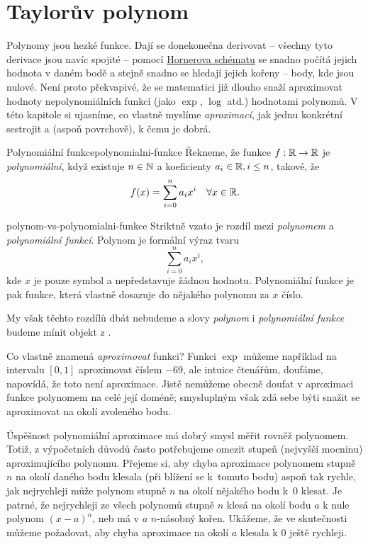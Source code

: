 \chapter{Taylorův polynom}
\label{chap:tayloruv-polynom}


Polynomy jsou hezké funkce. Dají se donekonečna derivovat -- všechny tyto
derivace jsou navíc spojité -- pomocí
\href{https://en.wikipedia.org/wiki/Horner%27s_method}{Hornerova schématu} se
 snadno počítá jejich hodnota v daném bodě a stejně snadno se hledají jejich
 kořeny -- body, kde jsou nulové. Není proto překvapivé, že se matematici již
 dlouho snaží aproximovat hodnoty nepolynomiálních funkcí (jako $\exp$, $\log$
 atd.) hodnotami polynomů. V této kapitole si ujasníme, co vlastně myslíme
 \emph{aproximací}, jak jednu konkrétní sestrojit a (aspoň povrchově), k čemu je
 dobrá.

\begin{definition}{Polynomiální funkce}{polynomialni-funkce}
 Řekneme, že funkce $f:\mathbb{R} \to \mathbb{R}$ je \emph{polynomiální}, když existuje $n \in
 \mathbb{N}$ a koeficienty $a_i \in \mathbb{R}, i \leq n$, takové, že
 \[
  f(x) = \sum_{i=0}^{n} a_i x^{i} \quad \forall x \in \mathbb{R}.
 \]
\end{definition}

\begin{remark}{}{polynom-vs-polynomialni-funkce}
 Striktně vzato je rozdíl mezi \emph{polynomem} a \emph{polynomiální funkcí}.
 Polynom je formální výraz tvaru
 \[
  \sum_{i=0}^{n} a_i x^{i},
 \]
 kde $x$ je pouze symbol a nepředstavuje žádnou hodnotu. Polynomiální funkce je
 pak funkce, která vlastně dosazuje do nějakého polynomu za $x$ číslo.

 My však těchto rozdílů dbát nebudeme a slovy \emph{polynom} i
 \emph{polynomiální funkce} budeme mínit objekt z
 .
\end{remark}

Co vlastně znamená \emph{aproximovat} funkci? Funkci $\exp$ můžeme například na
intervalu $[0,1]$ aproximovat číslem $-69$, ale intuice čtenářům, doufáme,
napovídá, že toto není  aproximace. Jistě nemůžeme obecně doufat v
aproximaci funkce polynomem na celé její doméně; smysluplným však zdá sebe býti
snažit se aproximovat na okolí zvoleného bodu.

Úspěšnost polynomiální aproximace má dobrý smysl měřit rovněž polynomem. Totiž,
z výpočetních důvodů často potřebujeme omezit stupeň (nejvyšší mocninu)
aproximujícího polynomu. Přejeme si, aby chyba aproximace polynomem stupně $n$
na okolí daného bodu klesala (při blížení se k~tomuto bodu) aspoň tak rychle,
jak nejrychleji může polynom stupně $n$ na okolí nějakého bodu k~$0$ klesat. Je
patrné, že nejrychleji ze všech polynomů stupně $n$ klesá na okolí bodu $a$ k
nule polynom $(x-a)^{n}$, neb má v $a$ $n$-násobný kořen. Ukážeme, že ve
skutečnosti můžeme požadovat, aby chyba aproximace na okolí $a$ klesala k $0$
ještě rychleji.

